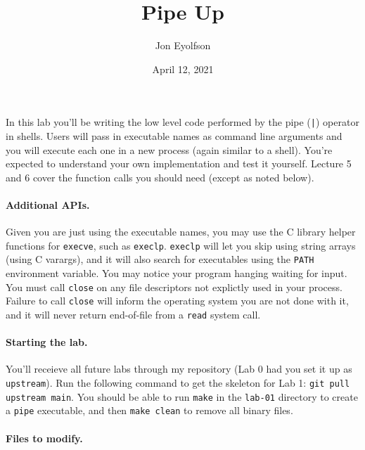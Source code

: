 

\title{Pipe Up}
\author{Jon Eyolfson}
\date{April 12, 2021}



\maketitle

In this lab you'll be writing the low level code performed by the pipe
(\texttt{|}) operator in shells.
Users will pass in executable names as command line arguments and you will
execute each one in a new process (again similar to a shell).
You're expected to understand your own implementation and test it yourself.
Lecture 5 and 6 cover the function calls you should need (except as noted
below).

\paragraph{Additional APIs.}

Given you are just using the executable names, you may use the C library helper
functions for \texttt{execve}, such as \texttt{execlp}.
\texttt{execlp} will let you skip using string arrays (using C varargs), and it
will also search for executables using the \texttt{PATH} environment variable.
You may notice your program hanging waiting for input.
You must call \texttt{close} on any file descriptors not explictly used in
your process.
Failure to call \texttt{close} will inform the operating system you are not done
with it, and it will never return end-of-file from a \texttt{read} system call.

\paragraph{Starting the lab.}

You'll receieve all future labs through my repository (Lab 0 had you set it up
as \texttt{upstream}).
Run the following command to get the skeleton for Lab 1:
\texttt{git pull upstream main}.
You should be able to run \texttt{make} in the \texttt{lab-01} directory to
create a \texttt{pipe} executable, and then \texttt{make clean} to remove all
binary files.

\paragraph{Files to modify.}


